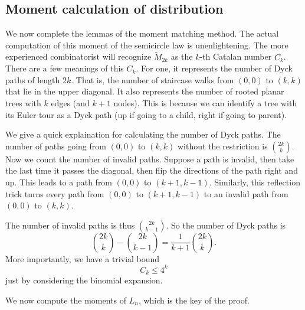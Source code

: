 \subsection*{Moment calculation of distribution}
We now complete the lemmas of the moment matching method.
The actual computation of this moment of the semicircle law is unenlightening.
The more experienced combinatorist will recognize $\tilde{M}_{2k}$ as the $k$-th Catalan number $C_k$. There are a few meanings of this $C_k$. For one, it represents the number of Dyck paths of length $2k$. That is, the number of staircase walks from $(0,0)$ to $(k,k)$ that lie in the upper diagonal. It also represents the number of rooted planar trees with $k$ edges (and $k+1$ nodes). This is because we can identify a tree with its Euler tour as a Dyck path (up if going to a child, right if going to parent). 

We give a quick explaination for calculating the number of Dyck paths. 
The number of paths going from $(0,0)$ to $(k,k)$ without the restriction is $\binom{2k}{k}$. Now we count the number of invalid paths. Suppose a path is invalid, then take the last time it passes the diagonal, then flip the directions of the path right and up. This leads to a path from $(0,0)$ to $(k+1,k-1)$. Similarly, this reflection trick turns every path from $(0,0)$ to $(k+1, k-1)$ to an invalid path from $(0,0)$ to $(k,k)$.

The number of invalid paths is thus $\binom{2k}{k-1}$. So the number of Dyck paths is \[
\binom{2k}{k}-\binom{2k}{k-1} = \frac{1}{k+1}\binom{2k}{k}.
\]
More importantly, we have a trivial bound \[
C_k \leq 4^k
\] just by considering the binomial expansion.

We now compute the moments of $L_n$, which is the key of the proof. 

